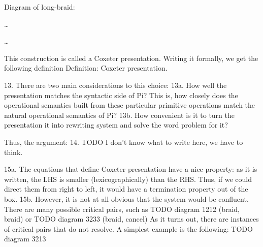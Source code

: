 Diagram of long-braid:
\hspace{0cm}
\dots
\hspace{0cm}
\hspace{1cm}
\hspace{1cm}
\hspace{0cm}
\dots
\hspace{0cm}
\hspace{1cm}


This construction is called a Coxeter presentation. Writing it formally, we
get the following definition
Definition: Coxeter presentation.

13. There are two main considerations to this choice:
13a. How well the presentation matches the syntactic side of Pi? This is,
how closely does the operational semantics built from these particular
primitive operations match the natural operational semantics of Pi?
13b. How convenient is it to turn the presentation it into rewriting system
and solve the word problem for it?

Thus, the argument:
14. TODO I don't know what to write here, we have to think.

15a. The equations that define Coxeter presentation have a nice property:
as it is written, the LHS is smaller (lexicographically) than the RHS.
Thus, if we could direct them from right to left, it would have a
termination property out of the box.
15b. However, it is not at all obvious that the system would be confluent.
There are many possible critical pairs, such as
TODO diagram 1212 (braid, braid)
or
TODO diagram 3233 (braid, cancel)
As it turns out, there are instances of critical pairs that do not resolve.
A simplest example is the following:
TODO diagram 3213

